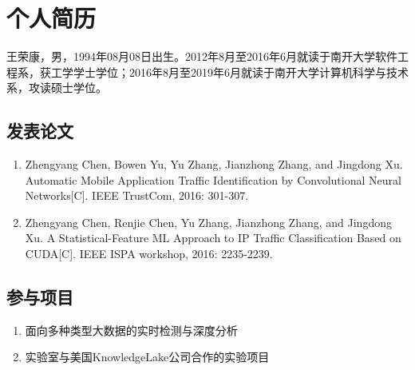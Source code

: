 

\chapter*{个人简历}
王荣康，男，1994年08月08日出生。2012年8月至2016年6月就读于南开大学软件工程系，获工学学士学位；2016年8月至2019年6月就读于南开大学计算机科学与技术系，攻读硕士学位。
\section*{发表论文}
\begin{enumerate}
\renewcommand{\labelenumi}{[\theenumi]}
\item Zhengyang Chen, Bowen Yu, Yu Zhang, Jianzhong Zhang, and Jingdong Xu. Automatic Mobile Application Traffic Identification by Convolutional Neural Networks[C]. IEEE TrustCom, 2016: 301-307.
\item Zhengyang Chen, Renjie Chen, Yu Zhang, Jianzhong Zhang, and Jingdong Xu. A Statistical-Feature ML Approach to IP Traffic Classification Based on CUDA[C]. IEEE ISPA workshop, 2016: 2235-2239.
\end{enumerate}
\section*{参与项目}
\begin{enumerate}
\renewcommand{\labelenumi}{[\theenumi]}
\item 面向多种类型大数据的实时检测与深度分析
\item 实验室与美国KnowledgeLake公司合作的实验项目
\end{enumerate}